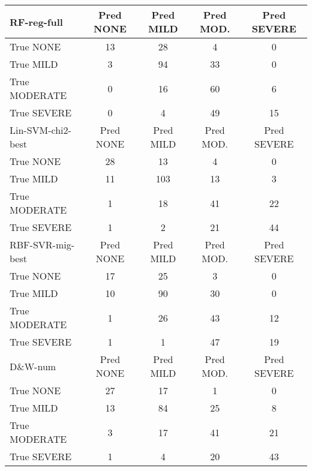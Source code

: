 {\renewcommand{\arraystretch}{0.75}%
\begin{table}[]
    \centering
    \begin{tabular}{|l|c|c|c|c|}
             \hline
   \cellcolor{gray!15} \textsf{RF-reg-full} & \textsf{Pred NONE} & \textsf{Pred MILD} & \textsf{Pred MOD.} & \textsf{Pred SEVERE} \\
   \hline
   \textsf{True NONE} & \cellcolor{gray!15} 13 & 28 & 4 & 0 \\
   \textsf{True MILD} & 3 & \cellcolor{gray!15} 94 & 33 & 0 \\
   \textsf{True MODERATE} & 0 & 16 & \cellcolor{gray!15} 60 & 6 \\
   \textsf{True SEVERE} & 0 & 4 & 49 & \cellcolor{gray!15} 15 \\
   \hline
   \cellcolor{gray!15} \textsf{Lin-SVM-chi2-best} & \textsf{Pred NONE} & \textsf{Pred MILD} & \textsf{Pred MOD.} & \textsf{Pred SEVERE} \\
   \hline
   \textsf{True NONE} & \cellcolor{gray!15} 28 & 13 & 4 & 0 \\
   \textsf{True MILD} & 11 & \cellcolor{gray!15} 103 & 13 & 3 \\
   \textsf{True MODERATE} & 1 & 18 & \cellcolor{gray!15} 41 & 22 \\
   \textsf{True SEVERE} & 1 & 2 & 21 & \cellcolor{gray!15} 44 \\
   \hline
   \cellcolor{gray!15} \textsf{RBF-SVR-mig-best} & \textsf{Pred NONE} & \textsf{Pred MILD} & \textsf{Pred MOD.} & \textsf{Pred SEVERE} \\
   \hline
   \textsf{True NONE} & \cellcolor{gray!15} 17 & 25 & 3 & 0 \\
   \textsf{True MILD} & 10 & \cellcolor{gray!15} 90 & 30 & 0 \\
   \textsf{True MODERATE} & 1 & 26 & \cellcolor{gray!15} 43 & 12 \\
   \textsf{True SEVERE} & 1 & 1 & 47 & \cellcolor{gray!15} 19 \\
   \hline
   \cellcolor{gray!15} \textsf{D\&W-num} & \textsf{Pred NONE} & \textsf{Pred MILD} & \textsf{Pred MOD.} & \textsf{Pred SEVERE} \\
   \hline
   \textsf{True NONE} & \cellcolor{gray!15} 27 & 17 & 1 & 0 \\
   \textsf{True MILD} & 13 & \cellcolor{gray!15} 84 & 25 & 8 \\
   \textsf{True MODERATE} & 3 & 17 & \cellcolor{gray!15} 41 & 21 \\
   \textsf{True SEVERE} & 1 & 4 & 20 & \cellcolor{gray!15} 43 \\

\end{tabular}
\end{table}}
